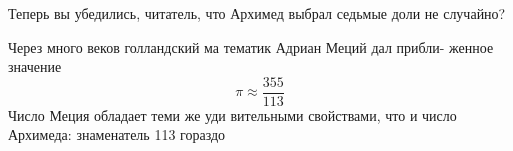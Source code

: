 \documentclass[11pt]{article}
\begin{document}
\begin{multicols}{2}
    Теперь вы убедились, читатель, что Архимед выбрал седьмые доли не случайно?
    
    Через много веков голландский ма тематик Адриан Меций дал прибли- женное значение
    \[\pi \approx \frac{355}{113}\]
    Число Меция обладает теми же уди вительными свойствами, что и число Архимеда: знаменатель 113 гораздо 
\end{multicols}
\end{document}
